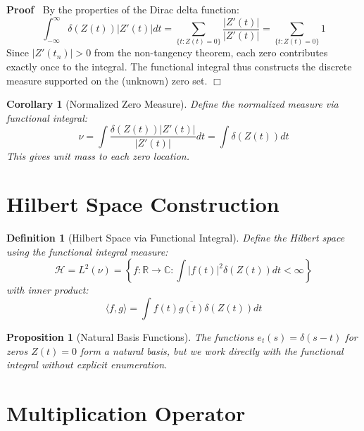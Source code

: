 \documentclass{article}
\newenvironment{proof}{\noindent\textbf{Proof\ }}{\hspace*{\fill}$\Box$\medskip}
\newtheorem{corollary}{Corollary}
\newtheorem{definition}{Definition}
\newtheorem{proposition}{Proposition}
{\theorembodyfont{\rmfamily}\newtheorem{remark}{Remark}}
\begin{document}
\begin{proof}
  By the properties of the Dirac delta function:
  \begin{equation}
    \int_{- \infty}^{\infty} \delta (Z (t)) |Z' (t) | dt = \sum_{\{t : Z (t) =
    0\}} \frac{|Z' (t) |}{|Z' (t) |} = \sum_{\{t : Z (t) = 0\}} 1
  \end{equation}
  Since $|Z' (t_n) | > 0$ from the non-tangency theorem, each zero contributes
  exactly once to the integral. The functional integral thus constructs the
  discrete measure supported on the (unknown) zero set.
\end{proof}

\begin{corollary}
  [Normalized Zero Measure] Define the normalized measure via functional
  integral:
  \begin{equation}
    \nu = \int \frac{\delta (Z (t)) |Z' (t) |}{|Z' (t) |} dt = \int \delta (Z
    (t)) dt
  \end{equation}
  This gives unit mass to each zero location.
\end{corollary}

\section{Hilbert Space Construction}

\begin{definition}
  [Hilbert Space via Functional Integral] Define the Hilbert space using the
  functional integral measure:
  \begin{equation}
    \mathcal{H}= L^2 (\nu) = \left\{ f : \mathbb{R} \to \mathbb{C}: \int |f
    (t) |^2 \delta (Z (t)) dt < \infty \right\}
  \end{equation}
  with inner product:
  \begin{equation}
    \langle f, g \rangle = \int f (t) \overline{g (t)} \delta (Z (t)) dt
  \end{equation}
\end{definition}

\begin{proposition}
  [Natural Basis Functions] The functions $e_t (s) = \delta (s - t)$ for zeros
  $Z (t) = 0$ form a natural basis, but we work directly with the functional
  integral without explicit enumeration.
\end{proposition}

\section{Multiplication Operator}
\end{document}
